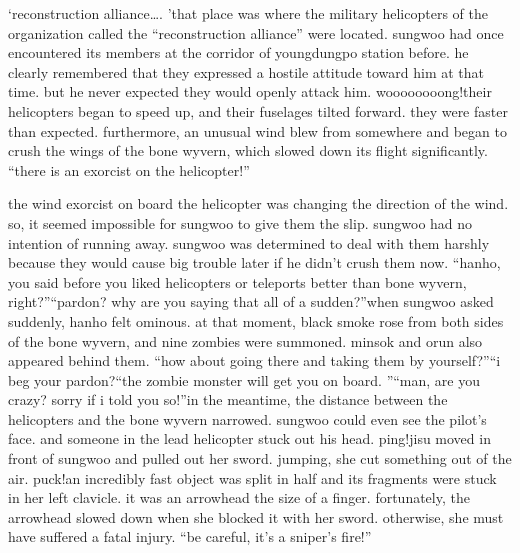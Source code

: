‘reconstruction alliance….
’that place was where the military helicopters of the organization called the “reconstruction alliance” were located.
sungwoo had once encountered its members at the corridor of youngdungpo station before.
 he clearly remembered that they expressed a hostile attitude toward him at that time.
but he never expected they would openly attack him.
woooooooong!their helicopters began to speed up, and their fuselages tilted forward.
 they were faster than expected.
furthermore, an unusual wind blew from somewhere and began to crush the wings of the bone wyvern, which slowed down its flight significantly.
“there is an exorcist on the helicopter!”

the wind exorcist on board the helicopter was changing the direction of the wind.
 so, it seemed impossible for sungwoo to give them the slip.
 sungwoo had no intention of running away.
sungwoo was determined to deal with them harshly because they would cause big trouble later if he didn’t crush them now.
“hanho, you said before you liked helicopters or teleports better than bone wyvern, right?”“pardon? why are you saying that all of a sudden?”when sungwoo asked suddenly, hanho felt ominous.
at that moment, black smoke rose from both sides of the bone wyvern, and nine zombies were summoned.
 minsok and orun also appeared behind them.
“how about going there and taking them by yourself?”“i beg your pardon?“the zombie monster will get you on board.
”“man, are you crazy? sorry if i told you so!”in the meantime, the distance between the helicopters and the bone wyvern narrowed.
sungwoo could even see the pilot’s face.
 and someone in the lead helicopter stuck out his head.
ping!jisu moved in front of sungwoo and pulled out her sword.
jumping, she cut something out of the air.
puck!an incredibly fast object was split in half and its fragments were stuck in her left clavicle.
it was an arrowhead the size of a finger.
fortunately, the arrowhead slowed down when she blocked it with her sword.
 otherwise, she must have suffered a fatal injury.
“be careful, it’s a sniper’s fire!”

 
